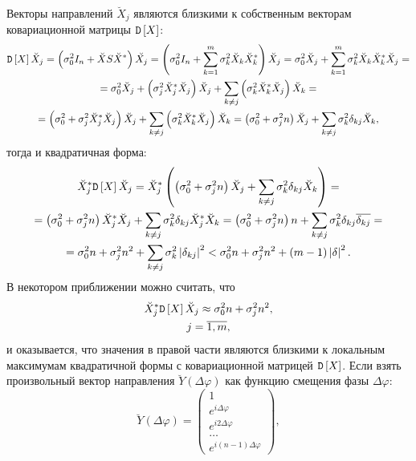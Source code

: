 Векторы направлений $\breve{X}_j$ являются близкими к собственным векторам ковариационной матрицы $\mathtt{D} \left [ X \right ]$:
\begin{multline*}
    \mathtt{D} \left [ X \right ] \breve{X}_j
    = \left ( \sigma_0^2 I_n + \breve{X} S \breve{X}^* \right ) \breve{X_j}
    = \left ( \sigma_0^2 I_n + \sum_{k=1}^m \sigma_k^2 \breve{X}_k \breve{X}_k^* \right ) \breve{X}_j
    = \sigma_0^2 \breve{X}_j + \sum_{k=1}^m \sigma_k^2 \breve{X}_k \breve{X}_k^* \breve{X}_j = \\
    = \sigma_0^2 \breve{X}_j + \left ( \sigma_j^2 \breve{X}_j^* \breve{X}_j \right ) \breve{X}_j + \sum_{k \neq j} \left ( \sigma_k^2 \breve{X}_k^* \breve{X}_j \right ) \breve{X}_k = \\
    = \left ( \sigma_0^2 + \sigma_j^2 \breve{X}_j^* \breve{X}_j \right ) \breve{X}_j + \sum_{k \neq j} \left ( \sigma_k^2 \breve{X}_k^* \breve{X}_j \right ) \breve{X}_k
    = \left ( \sigma_0^2 + \sigma_j^2 n \right ) \breve{X}_j + \sum_{k \neq j} \sigma_k^2 \delta_{kj} \breve{X}_k ,
\end{multline*}
тогда и квадратичная форма:
\begin{multline*}
    \breve{X}_j^* \mathtt{D} \left [ X \right ] \breve{X}_j
    = \breve{X}_j^* \left ( \left ( \sigma_0^2 + \sigma_j^2 n \right ) \breve{X}_j + \sum_{k \neq j} \sigma_k^2 \delta_{kj} \breve{X}_k \right ) = \\
    = \left ( \sigma_0^2 + \sigma_j^2 n \right ) \breve{X}_j^* \breve{X}_j + \sum_{k \neq j} \sigma_k^2 \delta_{kj} \breve{X}_j^* \breve{X}_k
    = \left ( \sigma_0^2 + \sigma_j^2 n \right ) n + \sum_{k \neq j} \sigma_k^2 \delta_{kj} \overline{\delta_{kj}} = \\
    = \sigma_0^2 n + \sigma_j^2 n^2 + \sum_{k \neq j} \sigma_k^2 \left | \delta_{kj} \right |^2
    < \sigma_0^2 n + \sigma_j^2 n^2 + (m-1) \left | \delta \right |^2 .
\end{multline*}
В некотором приближении можно считать, что
\begin{gather*}
    \breve{X}_j^* \mathtt{D} \left [ X \right ] \breve{X}_j \approx \sigma_0^2 n + \sigma_j^2 n^2 , \\
    j = \overline{1,m} ,
\end{gather*}
и оказывается, что значения в правой части являются близкими к локальным максимумам квадратичной формы с
ковариационной матрицей $\mathtt{D} \left [ X \right ]$. Если взять произвольный вектор направления $\breve{Y}(\Delta \varphi)$ как функцию смещения фазы $\Delta \varphi$:
\[
    \breve{Y}(\Delta \varphi) =
    \begin{pmatrix}
        1                      \\
        e^{i \Delta \varphi}   \\
        e^{i 2 \Delta \varphi} \\
        \dots                  \\
        e^{i (n-1) \Delta \varphi}
    \end{pmatrix} ,
\]
